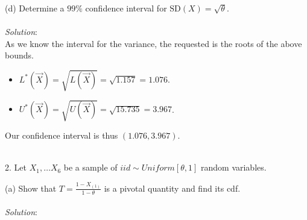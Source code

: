\documentclass[12pt]{article}
\newcommand{\XB}{\color{black}}
\newcommand{\XBB}{\color{blue}}
\newcommand{\ds}{\displaystyle}
\begin{document}
\vspace{2.5mm}

(d) Determine a $ 99\% $ confidence interval for $ \text{SD}(X) = \sqrt{\theta} $. \\
\vspace{2.5mm} \\
\textit{Solution}:
\vspace{2.5mm} \\

\noindent
As we know the interval for the variance, the requested is the roots of the above bounds. \\

\begin{itemize}
    \item $ \ds L^{*}(\overrightarrow{X}) = \sqrt{L(\overrightarrow{X})} = \sqrt{1.157} = 1.076 $. \\
    \item $ \ds U^{*}(\overrightarrow{X}) = \sqrt{U(\overrightarrow{X})} = \sqrt{15.735} = 3.967 $. \\
\end{itemize}

\noindent
Our confidence interval is thus $ (1.076, 3.967) $. \\

\vspace{2.5mm}

\newpage
\XBB\hrulefill\XB \\

2. Let $ X_{1}, \dots X_{6} $ be a sample of $ iid \sim Uniform[\theta, 1] $ random variables. \\

\XBB\hrulefill\XB
\vspace{5mm}

(a) Show that $ \ds T = \frac{1 - X_{(1)}}{1 - \theta} $ is a pivotal quantity and find its cdf. \\
\vspace{2.5mm} \\
\textit{Solution}:
\vspace{2.5mm} \\
\end{document}
